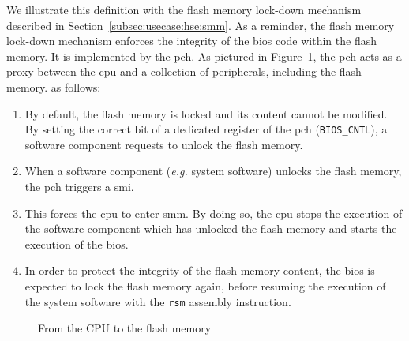 We illustrate this definition with the flash memory lock-down mechanism
described in Section~\ref{subsec:usecase:hse:smm}.
%
As a reminder, the flash memory lock-down mechanism enforces the integrity of
the \ac{bios} code within the flash memory.
%
It is implemented by the \ac{pch}.
%
As pictured in Figure~\ref{fig:speccert:flash}, the \ac{pch} acts as a proxy
between the \ac{cpu} and a collection of peripherals, including the flash
memory.
%
as follows:
%
\begin{enumerate}
\item By default, the flash memory is locked and its content cannot be modified.
  By setting the correct bit of a dedicated register of the \ac{pch}
  (\texttt{BIOS\_CNTL}), a software component requests to unlock the flash
  memory.
%
\item When a software component (\emph{e.g.} system software) unlocks the flash
  memory, the \ac{pch} triggers a \ac{smi}.
%
\item This forces the \ac{cpu} to enter \ac{smm}.
  By doing so, the \ac{cpu} stops the execution of the software component which
  has unlocked the flash memory and starts the execution of the \ac{bios}.
%
\item In order to protect the integrity of the flash memory content, the
  \ac{bios} is expected to lock the flash memory again, before resuming the
  execution of the system software with the \texttt{rsm} assembly instruction.
\end{enumerate}

\begin{figure}
  \centering

  \caption{From the CPU to the flash memory}
  \label{fig:speccert:flash}
\end{figure}

